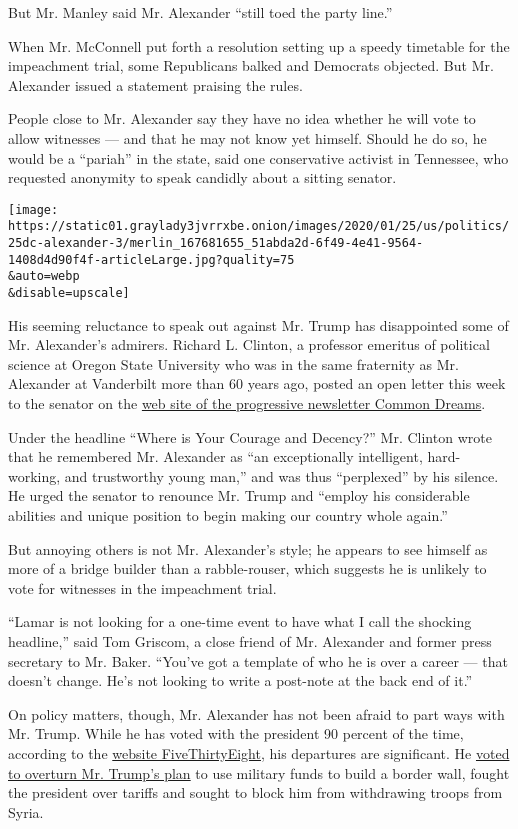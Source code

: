 But Mr. Manley said Mr. Alexander ``still toed the party line.''

When Mr. McConnell put forth a resolution setting up a speedy timetable
for the impeachment trial, some Republicans balked and Democrats
objected. But Mr. Alexander issued a statement praising the rules.

People close to Mr. Alexander say they have no idea whether he will vote
to allow witnesses --- and that he may not know yet himself. Should he
do so, he would be a ``pariah'' in the state, said one conservative
activist in Tennessee, who requested anonymity to speak candidly about a
sitting senator.

\texttt{[image: https://static01.graylady3jvrrxbe.onion/images/2020/01/25/us/politics/25dc-alexander-3/merlin\_167681655\_51abda2d-6f49-4e41-9564-1408d4d90f4f-articleLarge.jpg?quality=75\\\&auto=webp\\\&disable=upscale]}

His seeming reluctance to speak out against Mr. Trump has disappointed
some of Mr. Alexander's admirers. Richard L. Clinton, a professor
emeritus of political science at Oregon State University who was in the
same fraternity as Mr. Alexander at Vanderbilt more than 60 years ago,
posted an open letter this week to the senator on the
\href{https://www.commondreams.org/views/2020/01/21/where-your-courage-and-decency-open-letter-sen-lamar-alexander-childhood-friend}{web
site of the progressive newsletter Common Dreams}.

Under the headline ``Where is Your Courage and Decency?'' Mr. Clinton
wrote that he remembered Mr. Alexander as ``an exceptionally
intelligent, hard-working, and trustworthy young man,'' and was thus
``perplexed'' by his silence. He urged the senator to renounce Mr. Trump
and ``employ his considerable abilities and unique position to begin
making our country whole again.''

But annoying others is not Mr. Alexander's style; he appears to see
himself as more of a bridge builder than a rabble-rouser, which suggests
he is unlikely to vote for witnesses in the impeachment trial.

``Lamar is not looking for a one-time event to have what I call the
shocking headline,'' said Tom Griscom, a close friend of Mr. Alexander
and former press secretary to Mr. Baker. ``You've got a template of who
he is over a career --- that doesn't change. He's not looking to write a
post-note at the back end of it.''

On policy matters, though, Mr. Alexander has not been afraid to part
ways with Mr. Trump. While he has voted with the president 90 percent of
the time, according to the
\href{https://projects.fivethirtyeight.com/congress-trump-score/lamar-alexander/}{website
FiveThirtyEight}, his departures are significant. He
\href{https://www.congress.gov/bill/116th-congress/senate-joint-resolution/54}{voted
to overturn Mr. Trump's plan} to use military funds to build a border
wall, fought the president over tariffs and sought to block him from
withdrawing troops from Syria.

